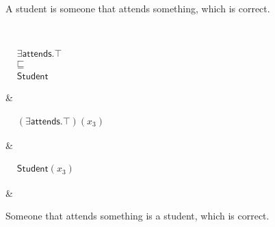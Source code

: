 \documentclass{amsart}
\newcommand\tableEntailmentSpacing{2.5cm}
\newcommand\tableExamplarSpacing{3.5cm}
\newcommand\tableCommentSpacing{4cm}
\begin{document}
\begin{table}
\begin{center}
\begin{tabular}
\begin{minipage}{\tableCommentSpacing}
            \vspace{2pt}
           A student is someone that attends something, which is correct.
            \vspace{2pt}
        \end{minipage}     
        \\        
        \begin{minipage}{\tableEntailmentSpacing}
        \vspace{2pt}
            $\begin{aligned}
              &\exists \mathsf{attends}.\top\\
  	      &\sqsubseteq\\
  	      &\mathsf{Student}
           \end{aligned}$
  	\end{minipage}
        &
        \begin{minipage}{\tableExamplarSpacing}
  	    $\begin{aligned}
               &(\exists \mathsf{attends}.\top)(x_3)
  	    \end{aligned}$
  	\end{minipage}
  	&
  	\begin{minipage}{\tableExamplarSpacing}
  	    \vspace{2pt}
  	   $\begin{aligned}
             &\mathsf{Student}(x_3)
  	    \end{aligned}$ 
  	\end{minipage}
        &
        \begin{minipage}{\tableCommentSpacing}
            \vspace{2pt}
            Someone that attends something is a student, which is correct.
            \vspace{2pt}
        \end{minipage}     
        \\
        \hline
       \end{tabular}
     \end{center}
     \normalsize
   \end{table}
\end{document}
